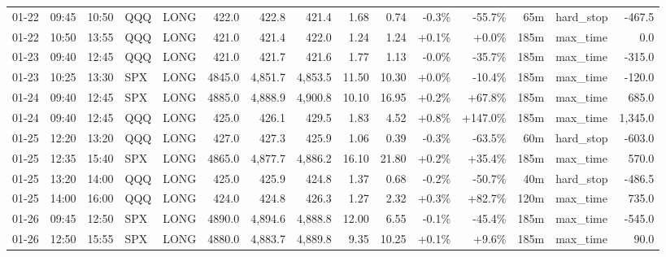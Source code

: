 \documentclass[11pt,a4paper,twoside]{article}
\begin{document}
\begin{landscape}
\begin{center}
\begin{longtable}{>{\color{txtmain}}l l l l l r r r r r r r r >{\color{txtmain}}l r}
01-22 & 09:45 & 10:50 & QQQ & LONG & 422.0 & 422.8 & 421.4 & 1.68 & 0.74 & \textcolor{lossred}{-0.3\%} & \textcolor{lossred}{-55.7\%} & 65m & hard\_stop & \textcolor{lossred}{-467.5} \\
01-22 & 10:50 & 13:55 & QQQ & LONG & 421.0 & 421.4 & 422.0 & 1.24 & 1.24 & \textcolor{wingreen}{+0.1\%} & \textcolor{wingreen}{+0.0\%} & 185m & max\_time & \textcolor{wingreen}{0.0} \\
01-23 & 09:40 & 12:45 & QQQ & LONG & 421.0 & 421.7 & 421.6 & 1.77 & 1.13 & \textcolor{lossred}{-0.0\%} & \textcolor{lossred}{-35.7\%} & 185m & max\_time & \textcolor{lossred}{-315.0} \\
01-23 & 10:25 & 13:30 & SPX & LONG & 4845.0 & 4,851.7 & 4,853.5 & 11.50 & 10.30 & \textcolor{wingreen}{+0.0\%} & \textcolor{lossred}{-10.4\%} & 185m & max\_time & \textcolor{lossred}{-120.0} \\
01-24 & 09:40 & 12:45 & SPX & LONG & 4885.0 & 4,888.9 & 4,900.8 & 10.10 & 16.95 & \textcolor{wingreen}{+0.2\%} & \textcolor{wingreen}{+67.8\%} & 185m & max\_time & \textcolor{wingreen}{685.0} \\
01-24 & 09:40 & 12:45 & QQQ & LONG & 425.0 & 426.1 & 429.5 & 1.83 & 4.52 & \textcolor{wingreen}{+0.8\%} & \textcolor{wingreen}{+147.0\%} & 185m & max\_time & \textcolor{wingreen}{1,345.0} \\
01-25 & 12:20 & 13:20 & QQQ & LONG & 427.0 & 427.3 & 425.9 & 1.06 & 0.39 & \textcolor{lossred}{-0.3\%} & \textcolor{lossred}{-63.5\%} & 60m & hard\_stop & \textcolor{lossred}{-603.0} \\
01-25 & 12:35 & 15:40 & SPX & LONG & 4865.0 & 4,877.7 & 4,886.2 & 16.10 & 21.80 & \textcolor{wingreen}{+0.2\%} & \textcolor{wingreen}{+35.4\%} & 185m & max\_time & \textcolor{wingreen}{570.0} \\
01-25 & 13:20 & 14:00 & QQQ & LONG & 425.0 & 425.9 & 424.8 & 1.37 & 0.68 & \textcolor{lossred}{-0.2\%} & \textcolor{lossred}{-50.7\%} & 40m & hard\_stop & \textcolor{lossred}{-486.5} \\
01-25 & 14:00 & 16:00 & QQQ & LONG & 424.0 & 424.8 & 426.3 & 1.27 & 2.32 & \textcolor{wingreen}{+0.3\%} & \textcolor{wingreen}{+82.7\%} & 120m & max\_time & \textcolor{wingreen}{735.0} \\
01-26 & 09:45 & 12:50 & SPX & LONG & 4890.0 & 4,894.6 & 4,888.8 & 12.00 & 6.55 & \textcolor{lossred}{-0.1\%} & \textcolor{lossred}{-45.4\%} & 185m & max\_time & \textcolor{lossred}{-545.0} \\
01-26 & 12:50 & 15:55 & SPX & LONG & 4880.0 & 4,883.7 & 4,889.8 & 9.35 & 10.25 & \textcolor{wingreen}{+0.1\%} & \textcolor{wingreen}{+9.6\%} & 185m & max\_time & \textcolor{wingreen}{90.0} \\

\end{longtable}
\end{center}
\end{landscape}
\end{document}
